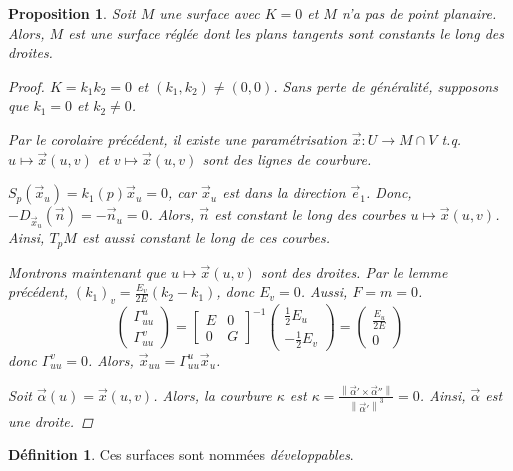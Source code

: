 \documentclass{report}
\newtheorem*{prop}{Proposition}
\theoremstyle{definition}
\newtheorem*{dfn}{D\'efinition}
\theoremstyle{remark}
\newcommand*{\norme}[1]{\left\|#1\right\|}
\begin{document}
	\begin{prop}
		Soit $M$ une surface avec $K=0$ et $M$ n'a pas de point planaire. Alors, $M$ est une surface r\'egl\'ee dont les plans tangents sont constants le long des droites.
		\begin{proof}
			$K=k_1k_2=0$ et $(k_1,k_2)\neq(0,0)$. Sans perte de g\'en\'eralit\'e, supposons que $k_1=0$ et $k_2\neq0$.

			Par le corolaire pr\'ec\'edent, il existe une param\'etrisation $\vec x:U\to M\cap V$ t.q. $u\mapsto\vec x(u,v)$ et $v\mapsto\vec x(u,v)$ sont des lignes de courbure.

			$S_p(\vec x_u)=k_1(p)\vec x_u=0$, car $\vec x_u$ est dans la direction $\vec e_1$. Donc, $-D_{\vec x_u}(\vec n)=-\vec n_u=0$. Alors, $\vec n$ est constant le long des courbes $u\mapsto\vec x(u,v)$. Ainsi, $T_pM$ est aussi constant le long de ces courbes.

			Montrons maintenant que $u\mapsto\vec x(u,v)$ sont des droites. Par le lemme pr\'ec\'edent, $(k_1)_v=\frac{E_v}{2E}(k_2-k_1)$, donc $E_v=0$. Aussi, $F=m=0$.
			\[ \begin{pmatrix}
				\Gamma_{uu}^u\\\Gamma_{uu}^v
			\end{pmatrix} = \begin{bmatrix}
				E&0\\0&G
			\end{bmatrix}^{-1} \begin{pmatrix}
				\frac{1}{2}E_u\\-\frac{1}{2}E_v
			\end{pmatrix} = \begin{pmatrix}
				\frac{E_u}{2E}\\0
			\end{pmatrix} \]
			donc $\Gamma_{uu}^v=0$. Alors, $\vec x_{uu}=\Gamma_{uu}^u\vec x_u$.

			Soit $\vec\alpha(u)=\vec x(u,v)$. Alors, la courbure $\kappa$ est $\kappa = \frac{\norme{\vec\alpha'\times\vec\alpha''}}{\norme{\vec\alpha'}^3} = 0$. Ainsi, $\vec\alpha$ est une droite.
		\end{proof}
	\end{prop}

	\begin{dfn}
		Ces surfaces sont nomm\'ees \emph{d\'eveloppables}.
	\end{dfn}
\end{document}
